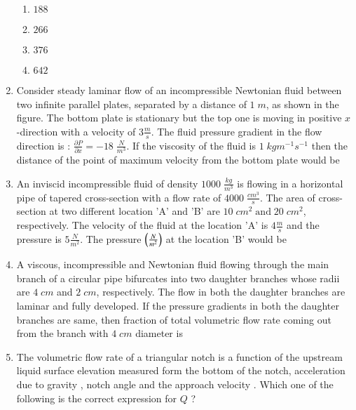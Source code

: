 \documentclass[journal,12pt,onecolumn]{IEEEtran}
\theoremstyle{remark}
\begin{document}
\begin{enumerate}[start=27]

	\begin{enumerate}
    \item $188$
    \item $266$
    \item $376$
    \item $642$
\end{enumerate}
\item Consider steady laminar flow of an incompressible Newtonian fluid between two infinite parallel plates, separated by a distance of $1\;m$, as shown in the figure. The bottom plate is stationary but the top one is moving in positive $x$-direction with a velocity of $3\frac{m}{s}$. The fluid pressure gradient in the flow direction is : $\frac{\partial P}{\partial x}=-18\;\frac{N}{m^3}$. If the viscosity of the fluid is $1\;kgm^{-1}s^{-1}$ then the distance of the point of maximum velocity  from the bottom plate would be \underline{\hspace{2cm}}
	
\item An inviscid incompressible fluid of density $1000\;\frac{kg}{m^3}$ is flowing in a horizontal pipe of tapered cross-section with a flow rate of $4000\;\frac{cm^3}{s}$. The area of cross-section at two different location 'A' and 'B' are $10\;cm^2 \;\text{and} \;20\;cm^2$, respectively. The velocity of the fluid at the location 'A' is $4\frac{m}{s}$ and the pressure is $5\frac{N}{m^2}$. The pressure $\left(\frac{N}{m^2}\right)$ at the location 'B' would be \underline{\hspace{2cm}}
\item A viscous, incompressible and Newtonian fluid flowing through the main branch of a circular pipe bifurcates into two daughter branches whose radii are $4\;cm$ and $2\;cm$, respectively. The flow in both the daughter branches are laminar and fully developed. If the pressure gradients in both the daughter branches are same, then fraction of total volumetric flow rate  coming out from the branch with $4\;cm$ diameter is \underline{\hspace{2cm}} 
	
\item The volumetric flow rate  of a triangular notch is a function of the upstream liquid surface elevation  measured form the bottom of the notch, acceleration due to gravity , notch angle \brak{\phi} and the approach velocity . Which one of the following is the correct expression for $Q$ ?

\end{enumerate}
\end{document}
